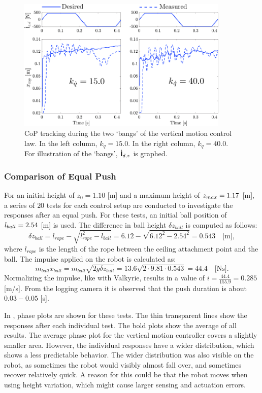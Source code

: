 \begin{figure}
\centering
\includegraphics[width=0.9\textwidth]{STYLESTUFF/atlascop.png}
\caption{\ac{CoP} tracking during the two `bangs' of the vertical motion control law. In the left column, $k_{\dot{q}}=15.0$. In the right column, $k_{\dot{q}}=40.0$. For illustration of the `bangs', $\dot{\mathbf{l}}_{d,z}$ is graphed. }
\label{fig:atlascop}
\end{figure}

\subsubsection{Comparison of Equal Push}
For an initial height of $z_0=1.10$ [m] and a maximum height of $z_{max}=1.17$ [m], a series of $20$ tests for each control setup are conducted to investigate the responses after an equal push. For these tests, an initial ball position of $l_{ball}=2.54$ [m] is used. The difference in ball height $\delta z_{ball}$ is computed as follows:
\begin{equation}
	\delta z_{ball} = l_{rope} - \sqrt{l_{rope}^2-l_{ball}} = 6.12-\sqrt{6.12^2 - 2.54^2} = 0.543 \quad \text{[m]},
\end{equation}
where $l_{rope}$ is the length of the rope between the ceiling attachment point and the ball. The impulse applied on the robot is calculated as:
\begin{equation}
m_{ball}\dot{x}_{ball} = m_{ball}\sqrt{2g\delta z_{ball} } = 13.6\sqrt{2 \cdot 9.81 \cdot 0.543} = 44.4 \quad \text{[Ns]}.
\end{equation}
Normalizing the impulse, like with Valkyrie, results in a value of $i=\frac{44.4}{155.9}=0.285$ [m/s]. From the logging camera it is observed that the push duration is about $0.03-0.05$ [s].

In , phase plots are shown for these tests. The thin transparent lines show the responses after each individual test. The bold plots show the average of all results. The average phase plot for the vertical motion controller covers a slightly smaller area. However, the individual responses have a wider distribution, which shows a less predictable behavior. The wider distribution was also visible on the robot, as sometimes the robot would visibly almost fall over, and sometimes recover relatively quick. A reason for this could be that the robot moves when using height variation, which might cause larger sensing and actuation errors.

